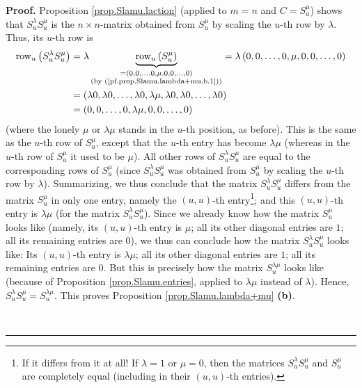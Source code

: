 \documentclass[numbers=enddot,12pt,final,onecolumn,notitlepage]{scrartcl}%
\theoremstyle{definition}
\newenvironment{proof}[1][Proof]{\noindent\textbf{#1.} }{\ \rule{0.5em}{0.5em}}
\begin{document}
\begin{proof}
Proposition \ref{prop.Slamu.laction} (applied to $m=n$ and $C=S_{u}^{\mu}$)
shows that $S_{u}^{\lambda}S_{u}^{\mu}$ is the $n\times n$-matrix obtained
from $S_{u}^{\mu}$ by scaling the $u$-th row by $\lambda$. Thus, its $u$-th
row is%
\begin{align*}
\operatorname*{row}\nolimits_{u}\left(  S_{u}^{\lambda}S_{u}^{\mu}\right)   &
=\lambda\underbrace{\operatorname*{row}\nolimits_{u}\left(  S_{u}^{\mu
}\right)  }_{\substack{=\left(  0,0,\ldots,0,\mu,0,0,\ldots,0\right)
\\\text{(by (\ref{pf.prop.Slamu.lambda+mu.b.1}))}}}=\lambda\left(
0,0,\ldots,0,\mu,0,0,\ldots,0\right) \\
&  =\left(  \lambda0,\lambda0,\ldots,\lambda0,\lambda\mu,\lambda
0,\lambda0,\ldots,\lambda0\right) \\
&  =\left(  0,0,\ldots,0,\lambda\mu,0,0,\ldots,0\right)
\end{align*}
(where the lonely $\mu$ or $\lambda\mu$ stands in the $u$-th position, as
before). This is the same as the $u$-th row of $S_{u}^{\mu}$, except that the
$u$-th entry has become $\lambda\mu$ (whereas in the $u$-th row of $S_{u}%
^{\mu}$ it used to be $\mu$). All other rows of $S_{u}^{\lambda}S_{u}^{\mu}$
are equal to the corresponding rows of $S_{u}^{\mu}$ (since $S_{u}^{\lambda
}S_{u}^{\mu}$ was obtained from $S_{u}^{\mu}$ by scaling the $u$-th row by
$\lambda$). Summarizing, we thus conclude that the matrix $S_{u}^{\lambda
}S_{u}^{\mu}$ differs from the matrix $S_{u}^{\mu}$ in only one entry, namely
the $\left(  u,u\right)  $-th entry\footnote{If it differs from it at all! If
$\lambda=1$ or $\mu=0$, then the matrices $S_{u}^{\lambda}S_{u}^{\mu}$ and
$S_{u}^{\mu}$ are completely equal (including in their $\left(  u,u\right)
$-th entries).}; and this $\left(  u,u\right)  $-th entry is $\lambda\mu$ (for
the matrix $S_{u}^{\lambda}S_{u}^{\mu}$). Since we already know how the matrix
$S_{u}^{\mu}$ looks like (namely, its $\left(  u,u\right)  $-th entry is $\mu
$; all its other diagonal entries are $1$; all its remaining entries are $0$),
we thus can conclude how the matrix $S_{u}^{\lambda}S_{u}^{\mu}$ looks like:
Its $\left(  u,u\right)  $-th entry is $\lambda\mu$; all its other diagonal
entries are $1$; all its remaining entries are $0$. But this is precisely how
the matrix $S_{u}^{\lambda\mu}$ looks like (because of Proposition
\ref{prop.Slamu.entries}, applied to $\lambda\mu$ instead of $\lambda$).
Hence, $S_{u}^{\lambda}S_{u}^{\mu}=S_{u}^{\lambda\mu}$. This proves
Proposition \ref{prop.Slamu.lambda+mu} \textbf{(b)}.


\end{proof}
\end{document}
